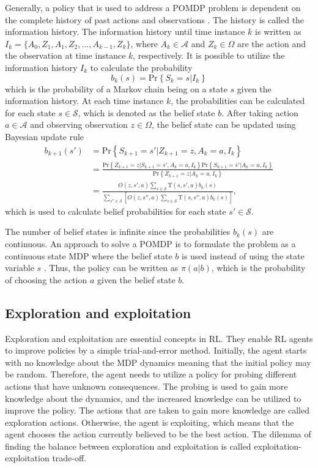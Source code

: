 \documentclass[english, 12pt, a4paper, elec, utf8, a-1b, online]{aaltothesis}
\newcommand{\Ss}{\mathcal{S}}
\newcommand{\As}{\mathcal{A}}
\newcommand{\Os}{\Omega}
\newcommand{\Op}{O}
\renewcommand{\Pr}[1]{\text{Pr}\left\{ #1 \right\}}
\begin{document}
Generally, a policy that is used to address a POMDP problem is dependent on the complete history of past actions and observations \cite{Krishnamurthy2016}. 
The history is called the information history.
The information history until time instance $k$ is written as $I_k=\{A_0, Z_1, A_1, Z_2, ..., A_{k-1}, Z_{k}\}$, where $A_k \in \As$ and $Z_k \in \Os$ are the action and the observation at time instance $k$, respectively.
It is possible to utilize the information history $I_k$ to calculate the probability
\begin{equation}
    b_k(s) = \Pr{S_k=s|I_k}
\end{equation}
which is the probability of a Markov chain being on a state $s$ given the information history.
At each time instance $k$, the probabilities can be calculated for each state $s \in \Ss$, which is denoted as the belief state $b$.
After taking action $a \in \As$ and observing observation $z \in \Os$, the belief state can be updated using Bayesian update rule \cite{Krishnamurthy2016}
\begin{align}
    b_{k+1}(s') 
    &= \Pr{S_{k+1}=s' | Z_{k+1}=z, A_k=a, I_k} \\
    &= \frac
        {\Pr{Z_{k+1}=z | S_{k+1}=s' , A_k=a, I_k} \Pr{S_{k+1}=s'| A_k=a, I_k}}
        {\Pr{Z_{k+1}=z | A_k=a, I_k}} \\
    &= \frac
        {\Op(z, s', a) \sum_{s \in \Ss} \mathrm{T}(s, s', a) b_k(s)}
        {\sum_{s''  \in \Ss} \left[ 
            \Op(z, s'', a) \sum_{s \in \Ss} \mathrm{T}(s, s'', a) b_k(s) \right]},  \label{eq:belief_state_update}
\end{align}
which is used to calculate belief probabilities for each state $s' \in \Ss$.

The number of belief states is infinite since the probabilities $b_k(s)$ are continuous.
An approach to solve a POMDP is to formulate the problem as a continuous state MDP where the belief state $b$ is used instead of using the state variable $s$ \cite{Krishnamurthy2016}.
Thus, the policy can be written as $\pi(a | b)$, which is the probability of choosing the action $a$ given the belief state $b$.

\subsection{Exploration and exploitation}\label{sec:exp_exp}

Exploration and exploitation are essential concepts in RL. 
They enable RL agents to improve policies by a simple trial-and-error method.
Initially, the agent starts with no knowledge about the MDP dynamics meaning that the initial policy may be random.
Therefore, the agent needs to utilize a policy for probing different actions that have unknown consequences.
The probing is used to gain more knowledge about the dynamics, and the increased knowledge can be utilized to improve the policy.
The actions that are taken to gain more knowledge are called exploration actions.
Otherwise, the agent is exploiting, which means that the agent chooses the action currently believed to be the best action.
The dilemma of finding the balance between exploration and exploitation is called exploitation-exploitation trade-off.
\end{document}
